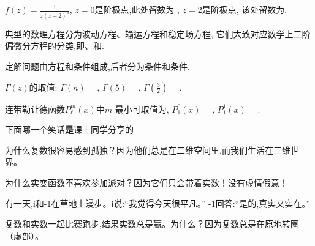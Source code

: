\documentclass{njustexam}
\begin{document}
\begin{problem}
 $ f(z) = \frac{1}{z( z- 2)^3}$, $z=0$是阶极点,此处留数为 ,
 $z=2$是阶极点, 该处留数为.
\end{problem}

\begin{problem}
典型的数理方程分为波动方程、输运方程和稳定场方程,
它们大致对应数学上二阶偏微分方程的分类,即、和.
\end{problem}

\begin{problem}
  定解问题由方程和条件组成,后者分为条件和条件.
\end{problem}

\begin{problem}
$\Gamma(z)$的取值: $\Gamma(n)=$, 
$\Gamma(5)=$,
 $\Gamma(\frac{3}{2})=$.
\end{problem}

\begin{problem}
连带勒让德函数$P_\ell^m(x)$中$m$%
最小可取值为\fillout{$-\ell$},
$P_1^0(x) = $, $P_1^1(x) = $.
\end{problem}


  


\begin{problem}
下面哪一个笑话{\bf{是}}课上同学分享的 
  \begin{abcd}
  \item 为什么复数很容易感到孤独？因为他们总是在二维空间里,而我们生活在三维世界。   
  \item 为什么实变函数不喜欢参加派对？因为它们只会带着实数！没有虚情假意！
  \item 有一天,i和-1在草地上漫步。i说:“我觉得今天很平凡。” -1回答:“是的,真实又实在。”
  \item 复数和实数一起比赛跑步,结果实数总是赢。为什么？因为复数总是在原地转圈（虚部）。
  \end{abcd}
  \end{problem}
\end{document}

